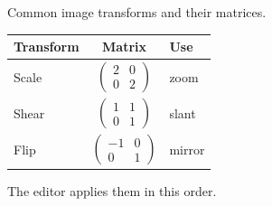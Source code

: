 \documentclass{article}
\begin{document}
Common image transforms and their matrices.

\begin{tabular}{|l|c|l|}
\hline
Transform & Matrix & Use \\
\hline
Scale & $\begin{pmatrix} 2 & 0 \\ 0 & 2 \end{pmatrix}$ & zoom \\
\hline
Shear & $\begin{pmatrix} 1 & 1 \\ 0 & 1 \end{pmatrix}$ & slant \\
\hline
Flip & $\begin{pmatrix} -1 & 0 \\ 0 & 1 \end{pmatrix}$ & mirror \\
\hline
\end{tabular}

The editor applies them in this order.
\end{document}
